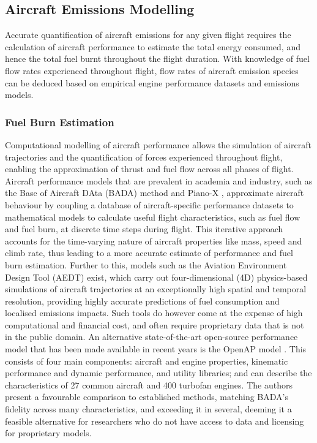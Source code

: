 

\subsection{Aircraft Emissions Modelling}
Accurate quantification of aircraft emissions for any given flight requires the calculation of aircraft performance to estimate the total energy consumed, and hence the total fuel burnt throughout the flight duration. With knowledge of fuel flow rates experienced throughout flight, flow rates of aircraft emission species can be deduced based on empirical engine performance datasets and emissions models.

\subsubsection{Fuel Burn Estimation}
Computational modelling of aircraft performance allows the simulation of aircraft trajectories and the quantification of forces experienced throughout flight, enabling the approximation of thrust and fuel flow across all phases of flight. Aircraft performance models that are prevalent in academia and industry, such as the Base of Aircraft DAta (BADA) method \cite{Nuic2010} and Piano-X \cite{PIANO_X}, approximate aircraft behaviour by coupling a database of aircraft-specific performance datasets to mathematical models to calculate useful flight characteristics, such as fuel flow and fuel burn, at discrete time steps during flight. This iterative approach accounts for the time-varying nature of aircraft properties like mass, speed and climb rate, thus leading to a more accurate estimate of performance and fuel burn estimation. Further to this, models such as the Aviation Environment Design Tool (AEDT) \cite{AEDT} exist, which carry out four-dimensional (4D) physics-based simulations of aircraft trajectories at an exceptionally high spatial and temporal resolution, providing highly accurate predictions of fuel consumption and localised emissions impacts. Such tools do however come at the expense of high computational and financial cost, and often require proprietary data that is not in the public domain. An alternative state-of-the-art open-source performance model that has been made available in recent years is the OpenAP model \cite{Sun2020}. This consists of four main components: aircraft and engine properties, kinematic performance and dynamic performance, and utility libraries; and can describe the characteristics of 27 common aircraft and 400 turbofan engines. The authors present a favourable comparison to established methods, matching BADA's fidelity across many characteristics, and exceeding it in several, deeming it a feasible alternative for researchers who do not have access to data and licensing for proprietary models. 

